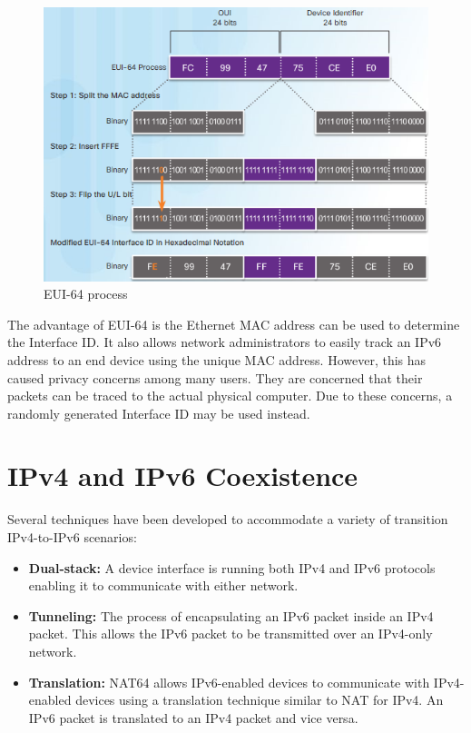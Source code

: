 \begin{figure}[hbtp]
\caption{EUI-64 process}\label{EUI64}
\centering
\includegraphics[scale=1]{pictures/EUI64.PNG}
\end{figure}

The advantage of EUI-64 is the Ethernet MAC address can be used to determine the Interface ID. It also allows network administrators to easily track an IPv6 address to an end device using the unique MAC address. However, this has caused privacy concerns among many users. They are concerned that their packets can be traced to the actual physical computer. Due to these concerns, a randomly generated Interface ID may be used instead. 

\section{IPv4 and IPv6 Coexistence}

Several techniques have been developed to accommodate a variety of transition IPv4-to-IPv6 scenarios:

\begin{itemize}
\item \textbf{Dual-stack:} A device interface is running both IPv4 and IPv6 protocols enabling it to communicate with either network.
\item \textbf{Tunneling:} The process of encapsulating an IPv6 packet inside an IPv4 packet. This allows the IPv6 packet to be transmitted over an IPv4-only network.
\item \textbf{Translation:} NAT64 allows IPv6-enabled devices to communicate with IPv4-enabled devices using a translation technique similar to NAT for IPv4. An IPv6 packet is translated to an IPv4 packet and vice versa.
\end{itemize}